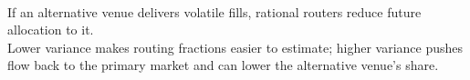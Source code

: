 \documentclass[a4paper,oneside,openany]{book}
\begin{document}
\begin{empiricalfinding} \\
If an alternative venue delivers volatile fills, rational routers reduce future allocation to it.\\
Lower variance makes routing fractions easier to estimate; higher variance pushes flow back to the primary market and can lower the alternative venue's share.
\end{empiricalfinding}
\end{document}
